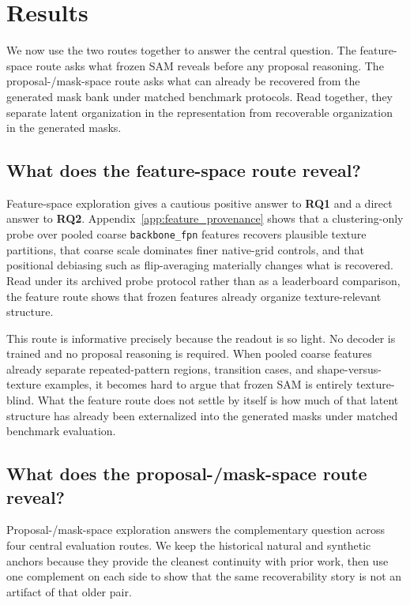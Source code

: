 \section{Results}
\label{sec:results}

We now use the two routes together to answer the central question. The feature-space route asks what frozen SAM reveals before any proposal reasoning. The proposal-/mask-space route asks what can already be recovered from the generated mask bank under matched benchmark protocols. Read together, they separate latent organization in the representation from recoverable organization in the generated masks.

\subsection{What does the feature-space route reveal?}

Feature-space exploration gives a cautious positive answer to \textbf{RQ1} and a direct answer to \textbf{RQ2}. Appendix~\ref{app:feature_provenance} shows that a clustering-only probe over pooled coarse \texttt{backbone\_fpn} features recovers plausible texture partitions, that coarse scale dominates finer native-grid controls, and that positional debiasing such as flip-averaging materially changes what is recovered. Read under its archived probe protocol rather than as a leaderboard comparison, the feature route shows that frozen features already organize texture-relevant structure.

This route is informative precisely because the readout is so light. No decoder is trained and no proposal reasoning is required. When pooled coarse features already separate repeated-pattern regions, transition cases, and shape-versus-texture examples, it becomes hard to argue that frozen SAM is entirely texture-blind. What the feature route does not settle by itself is how much of that latent structure has already been externalized into the generated masks under matched benchmark evaluation.

\subsection{What does the proposal-/mask-space route reveal?}



Proposal-/mask-space exploration answers the complementary question across four central evaluation routes. We keep the historical natural and synthetic anchors because they provide the cleanest continuity with prior work, then use one complement on each side to show that the same recoverability story is not an artifact of that older pair.

